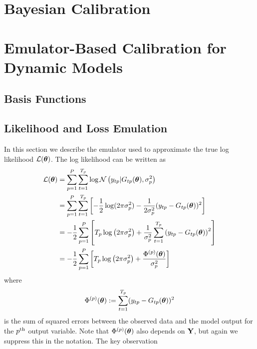 \documentclass[12pt]{article}
\begin{document}
\section{Bayesian Calibration}

\section{Emulator-Based Calibration for Dynamic Models}

\subsection{Basis Functions}

\subsection{Likelihood and Loss Emulation}
In this section we describe the emulator used to approximate the true log likelihood $\mathcal{L}(\boldsymbol{\theta})$. The log likelihood can be written as 
\begin{align*}
\mathcal{L}(\boldsymbol{\theta}) &= \sum_{p = 1}^{P} \sum_{t = 1}^{T_{p}} \log \mathcal{N}\left(y_{t p}| G_{t p}(\boldsymbol{\theta}), \sigma_{p}^2 \right) \\
	         &= \sum_{p = 1}^{P}  \sum_{t = 1}^{T_{p}} \left[-\frac{1}{2} \log(2\pi \sigma_{p}^2) - \frac{1}{2\sigma_{p}^2} (y_{t p} - G_{t p}(\boldsymbol{\theta}))^2\right]  \\
	         &= -\frac{1}{2} \sum_{p = 1}^{P} \left[T_{p} \log\left(2\pi \sigma_{p}^2 \right) + \frac{1}{\sigma_{p}^2}\sum_{t = 1}^{T_{p}} \left(y_{t p} - 
	                G_{t p}(\boldsymbol{\theta})\right)^2  \right] \\
	         &= -\frac{1}{2} \sum_{p = 1}^{P} \left[T_{p} \log\left(2\pi \sigma_{p}^2 \right) + \frac{\Phi^{(p)}(\boldsymbol{\theta})}{\sigma_{p}^2} \right] 
\end{align*}
where 
\[\Phi^{(p)}(\boldsymbol{\theta}) := \sum_{t = 1}^{T_{p}} (y_{t p} - G_{t p}(\boldsymbol{\theta}))^2\]
is the sum of squared errors between the observed data and the model output for the $p^{\text{th}}$ output variable. Note that $\Phi^{(p)}(\boldsymbol{\theta})$ also depends on $\mathbf{Y}$, but again we suppress this in the notation. The key observation 
\end{document}
